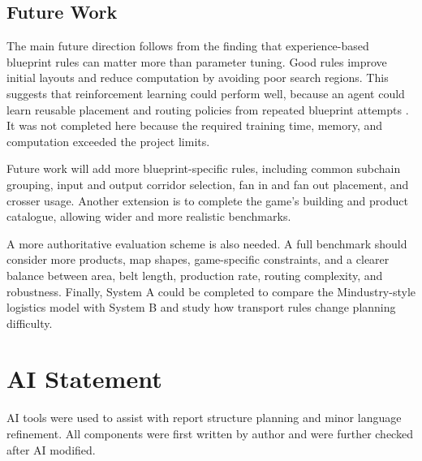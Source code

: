 \documentclass[11pt,a4paper]{article}
\begin{document}
\subsection{Future Work}

The main future direction follows from the finding that experience-based blueprint rules can matter more than parameter tuning. Good rules improve initial layouts and reduce computation by avoiding poor search regions. This suggests that reinforcement learning could perform well, because an agent could learn reusable placement and routing policies from repeated blueprint attempts \cite{sutton2018reinforcement}. It was not completed here because the required training time, memory, and computation exceeded the project limits.

Future work will add more blueprint-specific rules, including common subchain grouping, input and output corridor selection, fan in and fan out placement, and crosser usage. Another extension is to complete the game's building and product catalogue, allowing wider and more realistic benchmarks.

A more authoritative evaluation scheme is also needed. A full benchmark should consider more products, map shapes, game-specific constraints, and a clearer balance between area, belt length, production rate, routing complexity, and robustness. Finally, System A could be completed to compare the Mindustry-style logistics model with System B and study how transport rules change planning difficulty.

\section*{AI Statement}

AI tools were used to assist with report structure planning and minor language refinement. All components were first written by author and were further checked after AI modified.



\end{document}
